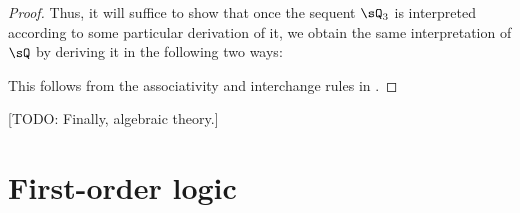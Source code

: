\documentclass{book}
\begin{document}
\begin{proof}
  Thus, it will suffice to show that once the sequent $\sQ_3$ is interpreted according to some particular derivation of it, we obtain the same interpretation of $\sQ$ by deriving it in the following two ways:
  This follows from the associativity and interchange rules in \cM.
\end{proof}

[TODO: Finally, algebraic theory.]




\chapter{First-order logic}
\label{chap:fol}






\end{document}
